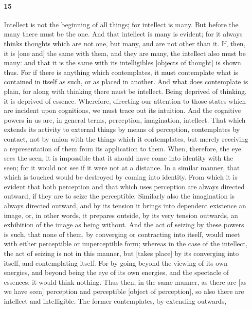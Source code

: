 \documentclass[12pt]{article}
\begin{document}
\paragraph{15} Intellect is not the beginning of all things; for intellect is
many. But before the many there must be the one. And that intellect is many is
evident; for it always thinks thoughts which are not one, but many, and are not
other than it. If, then, it is [one and] the same with them, and they are many,
the intellect also must be many: and that it is the same with its intelligibles
[objects of thought] is shown thus. For if there is anything which
contemplates, it must contemplate what is contained in itself as such, or as
placed in another. And what does contemplate is plain, for along with thinking
there must be intellect. Being deprived of thinking, it is deprived of essence.
Wherefore, directing our attention to those states which are incident upon
cognitions, we must trace out its intuition. And the cognitive powers in us
are, in general terms, perception, imagination, intellect. That which extends
its activity to external things by means of perception, contemplates by
contact, not by union with the things which it contemplates, but merely
receiving a representation of them from its application to them. When,
therefore, the eye sees the seen, it is impossible that it should have come
into identity with the seen; for it would not see if it were not at a distance.
In a similar manner, that which is touched would be destroyed by coming into
identity. From which it is evident that both perception and that which uses
perception are always directed outward, if they are to seize the perceptible.
Similarly also the imagination is always directed outward, and by its tension
it brings into dependent existence an image, or, in other words, it prepares
outside, by its very tension outwards, an exhibition of the image as being
without. And the act of seizing by these powers is such, that none of them, by
converging or contracting into itself, would meet with either perceptible or
imperceptible form; whereas in the case of the intellect, the act of seizing is
not in this manner, but [takes place] by its converging into itself, and
contemplating itself. For by going beyond the viewing of its own energies, and
beyond being the eye of its own energies, and the spectacle of essences, it
would think nothing. Thus then, in the same manner, as there are [as we have
seen] perception and perceptible [object of perception], so also there are
intellect and intelligible. The former contemplates, by extending outwards,
\end{document}
